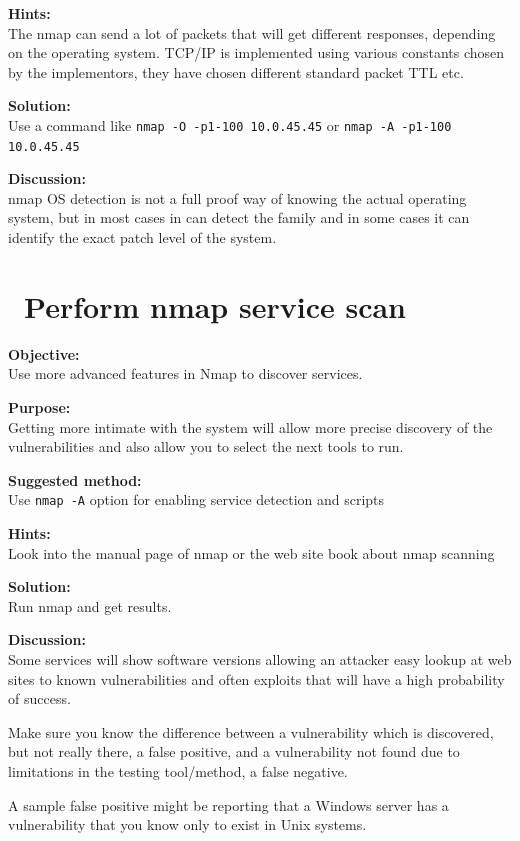 \documentclass[a4paper,11pt,notitlepage]{report}
\begin{document}
{\bf Hints:} \\

The nmap can send a lot of packets that will get different responses, depending on the operating system. TCP/IP is implemented using various constants chosen by the implementors, they have chosen different standard packet TTL etc.

{\bf Solution:}\\
Use a command like \verb+nmap -O -p1-100 10.0.45.45+ or  \verb+nmap -A -p1-100 10.0.45.45+


{\bf Discussion:}\\
nmap OS detection is not a full proof way of knowing the actual operating system, but in most cases in can detect the family and in some cases it can identify the exact patch level of the system.

\chapter{\faInfoCircle\ Perform nmap service scan}
\label{ex:nmap-service}

{\bf Objective:} \\
Use more advanced features in Nmap to discover services.

{\bf Purpose:}\\
Getting more intimate with the system will allow more precise discovery of the vulnerabilities and also allow you to select the next tools to run.

{\bf Suggested method:}\\
Use \verb+nmap -A+ option for enabling service detection and scripts

{\bf Hints:} \\
Look into the manual page of nmap or the web site book about nmap scanning

{\bf Solution:}\\
Run nmap and get results.

{\bf Discussion:}\\

Some services will show software versions allowing an attacker easy lookup at web sites to known vulnerabilities and often exploits that will have a high probability of success.

Make sure you know the difference between a vulnerability which is discovered, but not really there, a false positive, and a vulnerability not found due to limitations in the testing tool/method, a false negative.

A sample false positive might be reporting that a Windows server has a vulnerability that you know only to exist in Unix systems.
\end{document}
